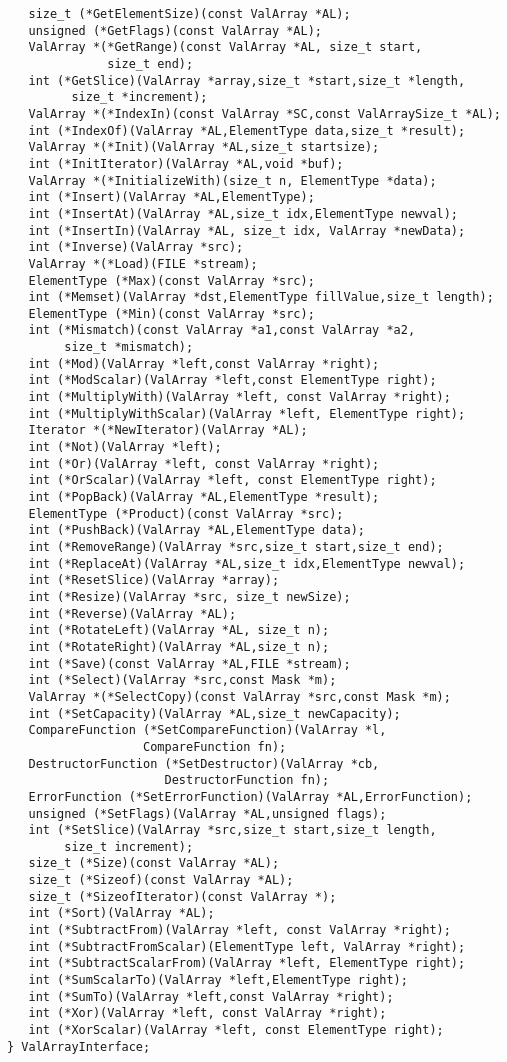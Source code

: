\begin{verbatim}
   size_t (*GetElementSize)(const ValArray *AL);
   unsigned (*GetFlags)(const ValArray *AL);
   ValArray *(*GetRange)(const ValArray *AL, size_t start,
              size_t end);
   int (*GetSlice)(ValArray *array,size_t *start,size_t *length,
         size_t *increment);
   ValArray *(*IndexIn)(const ValArray *SC,const ValArraySize_t *AL);
   int (*IndexOf)(ValArray *AL,ElementType data,size_t *result);
   ValArray *(*Init)(ValArray *AL,size_t startsize);
   int (*InitIterator)(ValArray *AL,void *buf);
   ValArray *(*InitializeWith)(size_t n, ElementType *data);
   int (*Insert)(ValArray *AL,ElementType);
   int (*InsertAt)(ValArray *AL,size_t idx,ElementType newval);
   int (*InsertIn)(ValArray *AL, size_t idx, ValArray *newData);
   int (*Inverse)(ValArray *src);
   ValArray *(*Load)(FILE *stream);
   ElementType (*Max)(const ValArray *src);
   int (*Memset)(ValArray *dst,ElementType fillValue,size_t length);
   ElementType (*Min)(const ValArray *src);
   int (*Mismatch)(const ValArray *a1,const ValArray *a2,
        size_t *mismatch);
   int (*Mod)(ValArray *left,const ValArray *right);
   int (*ModScalar)(ValArray *left,const ElementType right);
   int (*MultiplyWith)(ValArray *left, const ValArray *right);
   int (*MultiplyWithScalar)(ValArray *left, ElementType right);
   Iterator *(*NewIterator)(ValArray *AL);
   int (*Not)(ValArray *left);
   int (*Or)(ValArray *left, const ValArray *right);
   int (*OrScalar)(ValArray *left, const ElementType right);
   int (*PopBack)(ValArray *AL,ElementType *result);
   ElementType (*Product)(const ValArray *src);
   int (*PushBack)(ValArray *AL,ElementType data);
   int (*RemoveRange)(ValArray *src,size_t start,size_t end);
   int (*ReplaceAt)(ValArray *AL,size_t idx,ElementType newval);
   int (*ResetSlice)(ValArray *array);
   int (*Resize)(ValArray *src, size_t newSize);
   int (*Reverse)(ValArray *AL);
   int (*RotateLeft)(ValArray *AL, size_t n);
   int (*RotateRight)(ValArray *AL,size_t n);
   int (*Save)(const ValArray *AL,FILE *stream);
   int (*Select)(ValArray *src,const Mask *m);
   ValArray *(*SelectCopy)(const ValArray *src,const Mask *m);
   int (*SetCapacity)(ValArray *AL,size_t newCapacity);
   CompareFunction (*SetCompareFunction)(ValArray *l,
                   CompareFunction fn);
   DestructorFunction (*SetDestructor)(ValArray *cb,
                      DestructorFunction fn);
   ErrorFunction (*SetErrorFunction)(ValArray *AL,ErrorFunction);
   unsigned (*SetFlags)(ValArray *AL,unsigned flags);
   int (*SetSlice)(ValArray *src,size_t start,size_t length,
        size_t increment);
   size_t (*Size)(const ValArray *AL);
   size_t (*Sizeof)(const ValArray *AL);
   size_t (*SizeofIterator)(const ValArray *);
   int (*Sort)(ValArray *AL);
   int (*SubtractFrom)(ValArray *left, const ValArray *right);
   int (*SubtractFromScalar)(ElementType left, ValArray *right);
   int (*SubtractScalarFrom)(ValArray *left, ElementType right);
   int (*SumScalarTo)(ValArray *left,ElementType right);
   int (*SumTo)(ValArray *left,const ValArray *right);
   int (*Xor)(ValArray *left, const ValArray *right);
   int (*XorScalar)(ValArray *left, const ElementType right);
} ValArrayInterface;
\end{verbatim}
